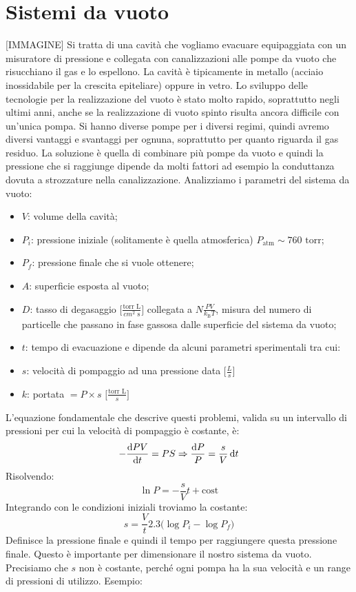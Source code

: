 \section{Sistemi da vuoto}
[IMMAGINE]
Si tratta di una cavità che vogliamo evacuare equipaggiata con un misuratore di pressione e collegata con canalizzazioni alle pompe da vuoto che risucchiano il gas e lo espellono. La cavità è tipicamente in metallo (acciaio inossidabile per la crescita epiteliare) oppure in vetro. Lo sviluppo delle tecnologie per la realizzazione del vuoto è stato molto rapido, soprattutto negli ultimi anni, anche se la realizzazione di vuoto spinto risulta ancora difficile con un'unica pompa. Si hanno diverse pompe per i diversi regimi, quindi avremo diversi vantaggi e svantaggi per ognuna, soprattutto per quanto riguarda il gas residuo. La soluzione è quella di combinare più pompe da vuoto e quindi la pressione che si raggiunge dipende da molti fattori ad esempio la conduttanza dovuta a strozzature nella canalizzazione. Analizziamo i parametri del sistema da vuoto:
\begin{itemize}
    \item $V$: volume della cavità;
    \item $P_i$: pressione iniziale (solitamente è quella atmosferica) $P_{\text{atm}}\sim 760 \text{ torr}$;
    \item $P_f$: pressione finale che si vuole ottenere;
    \item $A$: superficie esposta al vuoto;
    \item $D$: tasso di degasaggio $\bigg[\frac{\text{torr L}}{{cm}^2\text{ s}}\bigg]$ collegata a $N\frac{PV}{k_\text{B}T}$, misura del numero di particelle che passano in fase gassosa dalle superficie del sistema da vuoto;
    \item $t$: tempo di evacuazione e dipende da alcuni parametri sperimentali tra cui:
    \item $s$: velocità di pompaggio ad una pressione data $\bigg[\frac{L}{s}\bigg]$
    \item $k$: portata $=P\times s$ $\bigg[\frac{\text{torr L}}{s}\bigg]$
\end{itemize}

L'equazione fondamentale che descrive questi problemi, valida su un intervallo di pressioni per cui la velocità di pompaggio è costante, è:
\begin{equation*}
    -\dv{PV}{t}=PS \Rightarrow \frac{\dd{P}}{P}=\frac s V \dd{t}
\end{equation*}
Risolvendo:
\begin{equation*}
    \ln{P}=-\frac{s}{V}t +{\text{cost}}
\end{equation*}
Integrando con le condizioni iniziali troviamo la costante:
\begin{equation*}
    s=\frac V t 2.3\bigg(\log{P_i}-\log{P_f}\bigg)
\end{equation*}
Definisce la pressione finale e quindi il tempo per raggiungere questa pressione finale.
Questo è importante per dimensionare il nostro sistema da vuoto. Precisiamo che $s$ non è costante, perché ogni pompa ha la sua velocità e un range di pressioni di utilizzo.
Esempio:

